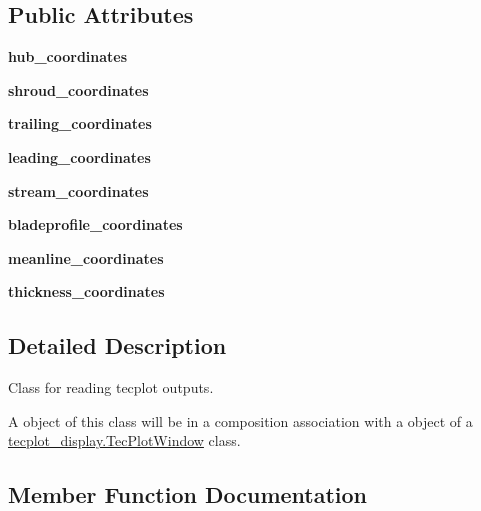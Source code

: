 \subsection*{Public Attributes}
\begin{DoxyCompactItemize}
\item 
\hypertarget{a00119_a2ccc38e7f7503e06d5c5fad58a071f80}{}\label{a00119_a2ccc38e7f7503e06d5c5fad58a071f80} 
{\bfseries hub\+\_\+coordinates}
\item 
\hypertarget{a00119_a583d4851d722f76e18ec7841357b4ea7}{}\label{a00119_a583d4851d722f76e18ec7841357b4ea7} 
{\bfseries shroud\+\_\+coordinates}
\item 
\hypertarget{a00119_ab6edfe4cfa33db98eb1414228f78a303}{}\label{a00119_ab6edfe4cfa33db98eb1414228f78a303} 
{\bfseries trailing\+\_\+coordinates}
\item 
\hypertarget{a00119_af991756a166df02da0a122d8d7c5c372}{}\label{a00119_af991756a166df02da0a122d8d7c5c372} 
{\bfseries leading\+\_\+coordinates}
\item 
\hypertarget{a00119_a4c8e60241684e96d45eabfb99e6955fd}{}\label{a00119_a4c8e60241684e96d45eabfb99e6955fd} 
{\bfseries stream\+\_\+coordinates}
\item 
\hypertarget{a00119_abd9898f018cbb1686522d50721f851a7}{}\label{a00119_abd9898f018cbb1686522d50721f851a7} 
{\bfseries bladeprofile\+\_\+coordinates}
\item 
\hypertarget{a00119_a33fc4c19a7badee5e2a88f3be97f8efb}{}\label{a00119_a33fc4c19a7badee5e2a88f3be97f8efb} 
{\bfseries meanline\+\_\+coordinates}
\item 
\hypertarget{a00119_a894f4ab5042e885fa8349c50c37059ac}{}\label{a00119_a894f4ab5042e885fa8349c50c37059ac} 
{\bfseries thickness\+\_\+coordinates}
\end{DoxyCompactItemize}


\subsection{Detailed Description}
Class for reading tecplot outputs. 

A object of this class will be in a composition association with a object of a \hyperlink{a00111}{tecplot\+\_\+display.\+Tec\+Plot\+Window} class. 

\subsection{Member Function Documentation}
\hypertarget{a00119_a9cf438934b57cd1d0bef90bcc00f27ac}{}\label{a00119_a9cf438934b57cd1d0bef90bcc00f27ac} 
